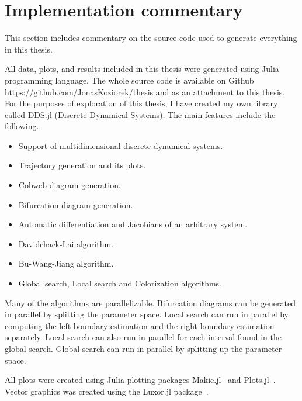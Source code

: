 \section{Implementation commentary}
This section includes commentary on the source code used to generate everything in this thesis.
\par
All data, plots, and results included in this thesis were generated using Julia programming language.
The whole source code is available on Github \url{https://github.com/JonasKoziorek/thesis} and as an attachment to this thesis.
For the purposes of exploration of this thesis, I have created my own library called DDS.jl (Discrete Dynamical Systems).
The main features include the following.
\begin{itemize}
    \item Support of multidimensional discrete dynamical systems.
    \item Trajectory generation and its plots.
    \item Cobweb diagram generation.
    \item Bifurcation diagram generation.
    \item Automatic differentiation and Jacobians of an arbitrary system.
    \item Davidchack-Lai algorithm.
    \item Bu-Wang-Jiang algorithm.
    \item Global search, Local search and Colorization algorithms.
\end{itemize}
Many of the algorithms are parallelizable.
Bifurcation diagrams can be generated in parallel by splitting the parameter space.
Local search can run in parallel by computing the left boundary estimation and the right boundary estimation separately.
Local search can also run in parallel for each interval found in the global search.
Global search can run in parallel by splitting up the parameter space.
\par
All plots were created using Julia plotting packages Makie.jl~\cite{Danisch2021} and Plots.jl~\cite{Christ2022}.
Vector graphics was created using the Luxor.jl package~\cite{Luxor2024}.

\endinput